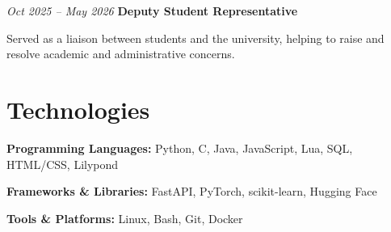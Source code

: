 \documentclass{cv}
\begin{document}
        \vspace{0.13 cm}

        \begin{twocolentry}{
        \textit{Oct 2025 – May 2026}}
            \textbf{Deputy Student Representative}
        \end{twocolentry}

        \vspace{0.10 cm}
        \begin{onecolentry}
            \begin{highlights}
                \item Served as a liaison between students and the university, helping to raise and resolve academic and administrative concerns.
            \end{highlights}
        \end{onecolentry}

    \section{Technologies}

        \begin{onecolentry}
            \textbf{Programming Languages:} Python, C, Java, JavaScript, Lua, SQL, HTML/CSS, Lilypond
        \end{onecolentry}

        \vspace{0.13 cm}

        \begin{onecolentry}
            \textbf{Frameworks \& Libraries:} FastAPI, PyTorch, scikit-learn, Hugging Face
        \end{onecolentry}

        \vspace{0.13 cm}

        \begin{onecolentry}
            \textbf{Tools \& Platforms:} Linux, Bash, Git, Docker
        \end{onecolentry}
\end{document}
